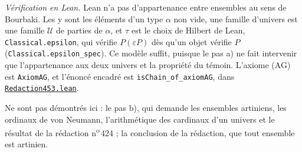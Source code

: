 \noindent\emph{Vérification en Lean.} Lean n'a pas d'appartenance entre ensembles au sens de Bourbaki. Les  y sont les éléments d'un type $\alpha$ non vide, une famille d'univers est une famille $\mathcal U$ de parties de $\alpha$, et $\tau$ est le choix de Hilbert de Lean, \texttt{Classical.\allowbreak{}epsilon}, qui vérifie $P(\varepsilon P)$ dès qu'un objet vérifie $P$ (\texttt{Classical.\allowbreak{}epsilon\_spec}). Ce modèle suffit, puisque le pas a) ne fait intervenir que l'appartenance aux deux univers et la propriété du témoin. L'axiome (AG) est \texttt{AxiomAG}, et l'énoncé encadré est \texttt{isChain\_of\_axiomAG}, dans \href{\leanblobmain/Redaction453.lean}{\texttt{Redaction453.\allowbreak{}lean}}.

Ne sont pas démontrés ici : le pas b), qui demande les ensembles artiniens, les ordinaux de von Neumann, l'arithmétique des cardinaux d'un univers et le résultat de la rédaction n\textsuperscript{o}\,424 ; la conclusion de la rédaction, que tout ensemble est artinien.
